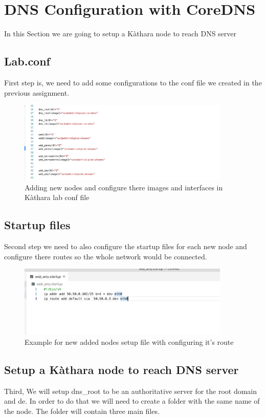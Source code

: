 \chapter{DNS Conﬁguration with CoreDNS}

In this Section we are going to setup a Kàthara node to reach DNS server

\section{Lab.conf}
 First step is, we need to add some configurations to the conf file we created in the previous assignment.
 \begin{figure}[H]
\centering
  \includegraphics[width=0.9\textwidth]{Images/confAdditions.png}
  \caption{Adding new nodes and configure there images and interfaces in Kàthara lab conf file}
  \label{fig:2.1}
\end{figure}
\section{Startup files}
Second step we need to also configure the startup files for each new node and configure there routes so the whole network would be connected.

 \begin{figure}[H]
\centering
  \includegraphics[width=0.9\textwidth]{Images/startupExample.png}
  \caption{Example for new added nodes setup file with configuring it's route}
  \label{fig:2.2}
\end{figure}


\section{Setup a Kàthara node to reach DNS server}
Third, We will setup dns\_root to be an authoritative server for the root domain and de. In order to do that we will need to create a folder with the same name of the node. The folder will contain three main files.
